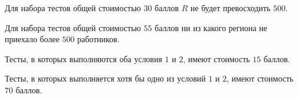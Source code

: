 Для набора тестов общей стоимостью $30$ баллов $R$ не будет превосходить $500$.

Для набора тестов общей стоимостью $55$ баллов ни из какого региона не приехало более $500$
работников.

Тесты, в которых выполняются оба условия $1$ и $2$, имеют стоимость $15$ баллов.

Тесты, в которых выполняется хотя бы одно из условий $1$ и $2$, имеют стоимость $70$ баллов.